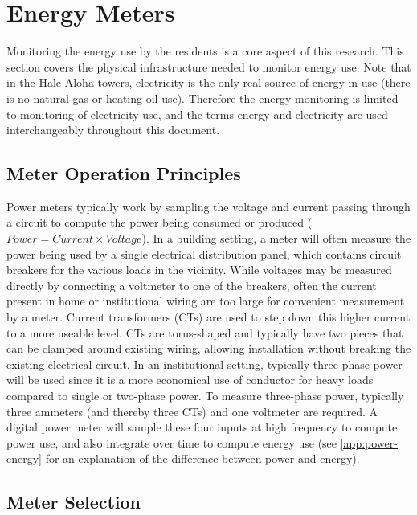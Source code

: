 \section{Energy Meters}
\label{sec:energy-meters}

Monitoring the energy use by the residents is a core aspect of this research. This section covers the physical infrastructure needed to monitor energy use. Note that in the Hale Aloha towers, electricity is the only real source of energy in use (there is no natural gas or heating oil use). Therefore the energy monitoring is limited to monitoring of electricity use, and the terms energy and electricity are used interchangeably throughout this document.


\subsection{Meter Operation Principles}

Power meters typically work by sampling the voltage and current passing through a circuit to compute the power being consumed or produced ($Power = Current \times Voltage$). In a building setting, a meter will often measure the power being used by a single electrical distribution panel, which contains circuit breakers for the various loads in the vicinity. While voltages may be measured directly by connecting a voltmeter to one of the breakers, often the current present in home or institutional wiring are too large for convenient measurement by a meter. Current transformers (CTs) are used to step down this higher current to a more useable level. CTs are torus-shaped and typically have two pieces that can be clamped around existing wiring, allowing installation without breaking the existing electrical circuit. In an institutional setting, typically three-phase power will be used since it is a more economical use of conductor for heavy loads compared to single or two-phase power. To measure three-phase power, typically three ammeters (and thereby three CTs) and one voltmeter are required. A digital power meter will sample these four inputs at high frequency to compute power use, and also integrate over time to compute energy use (see \autoref{app:power-energy} for an explanation of the difference between power and energy).


\subsection{Meter Selection}
\label{sec:meter-selection}

